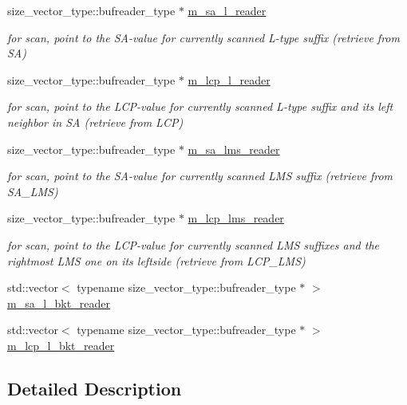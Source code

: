 \begin{DoxyCompactItemize}
size\+\_\+vector\+\_\+type\+::bufreader\+\_\+type $\ast$ \hyperlink{struct_validate4_1_1_r_scan_a02e30a17efa641c20f6b979a21be9082}{m\+\_\+sa\+\_\+l\+\_\+reader}
\begin{DoxyCompactList}\small\item\em for scan, point to the S\+A-\/value for currently scanned L-\/type suffix (retrieve from SA) \end{DoxyCompactList}\item 
size\+\_\+vector\+\_\+type\+::bufreader\+\_\+type $\ast$ \hyperlink{struct_validate4_1_1_r_scan_a9aa4704ec4b22e0ecbec8c1c9687521d}{m\+\_\+lcp\+\_\+l\+\_\+reader}
\begin{DoxyCompactList}\small\item\em for scan, point to the L\+C\+P-\/value for currently scanned L-\/type suffix and its left neighbor in SA (retrieve from L\+CP) \end{DoxyCompactList}\item 
size\+\_\+vector\+\_\+type\+::bufreader\+\_\+type $\ast$ \hyperlink{struct_validate4_1_1_r_scan_a986bdf3f5bc40e0d41939f699ac68c2c}{m\+\_\+sa\+\_\+lms\+\_\+reader}
\begin{DoxyCompactList}\small\item\em for scan, point to the S\+A-\/value for currently scanned L\+MS suffix (retrieve from S\+A\+\_\+\+L\+MS) \end{DoxyCompactList}\item 
size\+\_\+vector\+\_\+type\+::bufreader\+\_\+type $\ast$ \hyperlink{struct_validate4_1_1_r_scan_aa712f18affa902ade5907584476a5003}{m\+\_\+lcp\+\_\+lms\+\_\+reader}
\begin{DoxyCompactList}\small\item\em for scan, point to the L\+C\+P-\/value for currently scanned L\+MS suffixes and the rightmost L\+MS one on its leftside (retrieve from L\+C\+P\+\_\+\+L\+MS) \end{DoxyCompactList}\item 
std\+::vector$<$ typename size\+\_\+vector\+\_\+type\+::bufreader\+\_\+type $\ast$ $>$ \hyperlink{struct_validate4_1_1_r_scan_adbffde97174383da7a58437bf76ab0fe}{m\+\_\+sa\+\_\+l\+\_\+bkt\+\_\+reader}
\item 
std\+::vector$<$ typename size\+\_\+vector\+\_\+type\+::bufreader\+\_\+type $\ast$ $>$ \hyperlink{struct_validate4_1_1_r_scan_a83351c07dee43e836114a49df9a0ec0a}{m\+\_\+lcp\+\_\+l\+\_\+bkt\+\_\+reader}
\end{DoxyCompactItemize}


\subsection{Detailed Description}
